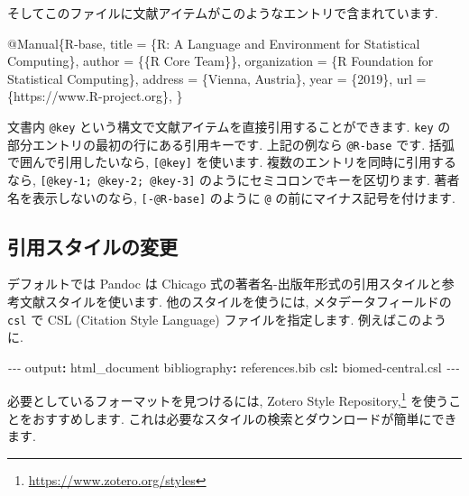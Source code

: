 \documentclass[
  11pt,
]{bxjsreport}
\newenvironment{Shaded}{\begin{snugshade}}{\end{snugshade}}
\newcommand{\AttributeTok}[1]{\textcolor[rgb]{0.77,0.63,0.00}{#1}}
\newcommand{\DataTypeTok}[1]{\textcolor[rgb]{0.13,0.29,0.53}{#1}}
\newcommand{\FunctionTok}[1]{\textcolor[rgb]{0.00,0.00,0.00}{#1}}
\newcommand{\KeywordTok}[1]{\textcolor[rgb]{0.13,0.29,0.53}{\textbf{#1}}}
\newcommand{\NormalTok}[1]{#1}
\newcommand{\OtherTok}[1]{\textcolor[rgb]{0.56,0.35,0.01}{#1}}
\newcommand{\PreprocessorTok}[1]{\textcolor[rgb]{0.56,0.35,0.01}{\textit{#1}}}
\newcommand{\VariableTok}[1]{\textcolor[rgb]{0.00,0.00,0.00}{#1}}
\renewcommand{\href}[2]{#2\footnote{\url{#1}}}
\begin{document}
そしてこのファイルに文献アイテムがこのようなエントリで含まれています.

\begin{Shaded}
\begin{Highlighting}[]
\VariableTok{@Manual}\NormalTok{\{}\OtherTok{R}\NormalTok{{-}}\OtherTok{base}\NormalTok{,}
  \DataTypeTok{title}\NormalTok{ = \{R: A Language and Environment for Statistical}
\NormalTok{           Computing\},}
  \DataTypeTok{author}\NormalTok{ = \{\{R Core Team\}\},}
  \DataTypeTok{organization}\NormalTok{ = \{R Foundation for Statistical Computing\},}
  \DataTypeTok{address}\NormalTok{ = \{Vienna, Austria\},}
  \DataTypeTok{year}\NormalTok{ = \{2019\},}
  \DataTypeTok{url}\NormalTok{ = \{https://www.R{-}project.org\},}
\NormalTok{\}}
\end{Highlighting}
\end{Shaded}

文書内 \texttt{@key} という構文で文献アイテムを直接引用することができます. \texttt{key} の部分エントリの最初の行にある引用キーです. 上記の例なら \texttt{@R-base} です. 括弧で囲んで引用したいなら, \texttt{{[}@key{]}} を使います. 複数のエントリを同時に引用するなら, \texttt{{[}@key-1;\ @key-2;\ @key-3{]}} のようにセミコロンでキーを区切ります. 著者名を表示しないのなら, \texttt{{[}-@R-base{]}} のように \texttt{@} の前にマイナス記号を付けます.

\hypertarget{changing-citation-style}{%
\subsection{引用スタイルの変更}\label{changing-citation-style}}

デフォルトでは Pandoc は Chicago 式の著者名-出版年形式の引用スタイルと参考文献スタイルを使います. 他のスタイルを使うには, メタデータフィールドの \texttt{csl} で CSL (Citation Style Language) ファイルを指定します. 例えばこのように.

\begin{Shaded}
\begin{Highlighting}[]
\PreprocessorTok{{-}{-}{-}}
\FunctionTok{output}\KeywordTok{:}\AttributeTok{ html\_document}
\FunctionTok{bibliography}\KeywordTok{:}\AttributeTok{ references.bib}
\FunctionTok{csl}\KeywordTok{:}\AttributeTok{ biomed{-}central.csl}
\PreprocessorTok{{-}{-}{-}}
\end{Highlighting}
\end{Shaded}

必要としているフォーマットを見つけるには, \href{https://www.zotero.org/styles}{Zotero Style Repository,} を使うことをおすすめします. これは必要なスタイルの検索とダウンロードが簡単にできます.
\end{document}
